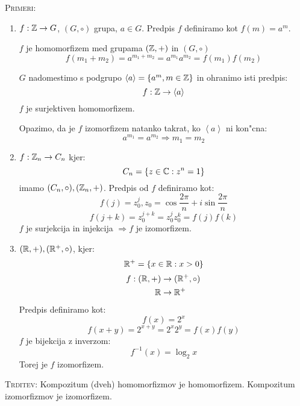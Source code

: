 \textsc{Primeri:}
\begin{enumerate}[(1)]
	\item $f: \mathbb{Z} \to G$, $(G, \circ)$ grupa, $a \in G$. Predpis $f$ definiramo kot $f(m) = a^m$.
	
	$f$ je homomorfizem med grupama $(\mathbb{Z}, +)$ in $(G,\circ)$
	\begin{equation*}
	f(m_1 + m_2) = a^{m_1 + m_2} = a^{m_1} a^{m_2} = f(m_1) f(m_2)
	\end{equation*}
	
	$G$ nadomestimo s podgrupo $\left<a\right> = \{a^m, m \in \mathbb{Z}\}$ in ohranimo isti predpis:
	\begin{equation*}
	f: \mathbb{Z} \to \left<a\right>
	\end{equation*}
	 $f$ je surjektiven homomorfizem.
	 
	 Opazimo, da je $f$ izomorfizem natanko takrat, ko $\left<a\right>$ ni kon"cna:
	 \begin{equation*}
	 a^{m_1} = a^{m_2} \Rightarrow m_1 = m_2
	 \end{equation*}
	 
	 \item $f: \mathbb{Z}_n \to C_n$ kjer:
	 \begin{equation*}
	 C_n = \{z \in \mathbb{C}: z^n = 1\}
	 \end{equation*}
	 imamo $(C_n, \circ), (\mathbb{Z}_n, +)$. Predpis od $f$ definiramo kot:
	 \begin{equation*}
	 f(j) = z_0^j, z_0 = \cos \dfrac{2\pi}{n} + i \sin \dfrac{2\pi}{n}
	 \end{equation*}
	 \begin{equation*}
	 f(j+k) = z_0^{j+k} = z_0^j z_0^k = f(j) f(k)
	 \end{equation*}
	 $f$ je surjekcija in injekcija $\Rightarrow f$ je izomorfizem.
	 
	 \item $(\mathbb{R}, +), (\mathbb{R}^+, \circ)$, kjer:
	 \begin{equation*}
	 \mathbb{R}^+ = \{x \in \mathbb{R}: x > 0\}
	 \end{equation*}
	 \begin{align*}
	 f: (\mathbb{R}, +) &\to (\mathbb{R}^+, \circ) \\
	 \mathbb{R} &\to \mathbb{R}^+
	 \end{align*}
	 Predpis definiramo kot:
	 \begin{equation*}
	 f(x) = 2^x
	 \end{equation*}
	 \begin{equation*}
	 f(x+y) = 2^{x+y} = 2^x 2^y = f(x) f(y)
	 \end{equation*}
	 $f$ je bijekcija z inverzom:
	 \begin{equation*}
	 f^{-1}(x) = \log_2 x
	 \end{equation*}
	 Torej je $f$ izomorfizem.
\end{enumerate}
\textsc{Trditev:} Kompozitum (dveh) homomorfizmov je homomorfizem. Kompozitum izomorfizmov je izomorfizem.

